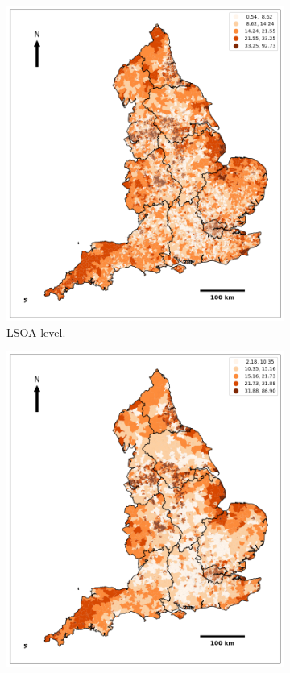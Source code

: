 \begin{figure}[ht]
\centering
\begin{subfigure}{.39\textwidth}
  \centering
  \includegraphics[width=1\linewidth]{ucl-latex-thesis-templates-master/Image/datageo_IMDLSOA_2.1.png}
  \caption{LSOA level.}
  \label{fig:A3.21}
\end{subfigure}%
\begin{subfigure}{.39\textwidth}
  \centering
  \includegraphics[width=1\linewidth]{ucl-latex-thesis-templates-master/Image/datageo_IMDMSOA_2.2.png}

\end{subfigure}
\end{figure}
